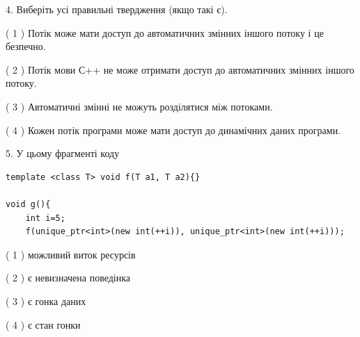 \documentclass[12pt, ukrainian]{article}
\begin{document}
\begin {large}
{%
4. Виберіть усі правильні твердження (якщо такі є).\par
\vspace{2mm}

( 1 ) Потік може мати доступ до автоматичних змінних іншого потоку і це безпечно.%

( 2 ) Потік мови С++ не може отримати доступ до автоматичних змінних іншого потоку.%

( 3 ) Автоматичні змінні не можуть розділятися між потоками.%

( 4 ) Кожен потік програми може мати доступ до динамічних даних програми.%


5. У цьому фрагменті коду
\begin{verbatim}
template <class T> void f(T a1, T a2){}

void g(){
    int i=5;
    f(unique_ptr<int>(new int(++i)), unique_ptr<int>(new int(++i)));
\end{verbatim}

( 1 ) можливий виток ресурсів%

( 2 ) є невизначена поведінка%

( 3 ) є гонка даних%

( 4 ) є стан гонки%
}
\end {large}
\end{document}
